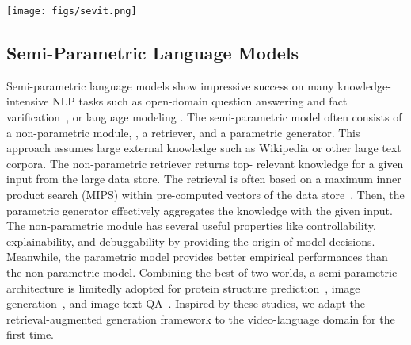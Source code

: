 \documentclass{article}
\newcommand{\frameworkname}{SeViT}
\begin{document}
\begin{figure*}[t!] 
\centering
\texttt{[image: figs/sevit.png]}
\caption{Detailed illustration for mechanism of \frameworkname{}. 1) It first retrieves top- query-relevant frames from a video via maximum inner product search (MIPS) between a query vector and (pre-computed)  frame vectors, where . 2) Each frame is encoded with the query  independently by the encoder of VGT-Generator. It produces  query-aware representations. 3) We explore two late fusion methods, 3-(a) Marginalization~\cite{lewis2020retrieval} and 3-(b) Fusion-in-Decoder~\cite{izacard2021leveraging} to produce the final output  by aggregating the  query-aware frames in the decoder.}
\label{fig:overview}
\end{figure*}

\subsection{Semi-Parametric Language Models}

Semi-parametric language models show impressive success on many knowledge-intensive NLP tasks such as open-domain question answering and fact varification~\cite{guu2020retrieval, lewis2020retrieval, izacard2021leveraging, izacard2022few}, or language modeling \cite{khandelwal2019generalization, borgeaud2021improving}. The semi-parametric model often consists of a non-parametric module, \ie, a retriever, and a parametric generator. This approach assumes large external knowledge such as Wikipedia or other large text corpora. The non-parametric retriever returns top- relevant knowledge for a given input from the large data store. The retrieval is often based on a maximum inner product search (MIPS) within pre-computed vectors of the data store~\cite{johnson2019billion}. Then, the parametric generator effectively aggregates the knowledge with the given input. The non-parametric module has several useful properties like controllability, explainability, and debuggability by providing the origin of model decisions. Meanwhile, the parametric model provides better empirical performances than the non-parametric model. Combining the best of two worlds, a semi-parametric architecture is limitedly adopted for protein structure prediction~\cite{jumper2021highly}, image generation~\cite{blattmann2022semi}, and image-text QA~\cite{chen2022murag, lin2022retrieval}. Inspired by these studies, we adapt the retrieval-augmented generation framework to the video-language domain for the first time.
\end{document}
